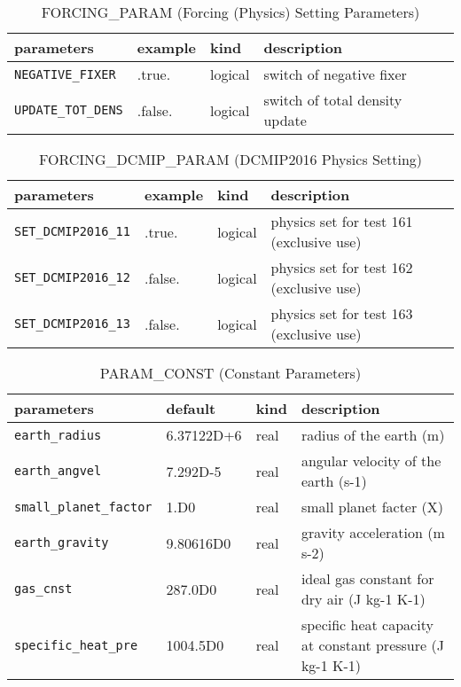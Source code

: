 \begin{table}[htb]
\begin{center}
\caption{FORCING\_PARAM (Forcing (Physics) Setting Parameters)}
\begin{tabularx}{150mm}{|l|l|l|X|} \hline
 \rowcolor[gray]{0.9} parameters & example & kind & description          \\ \hline
 \verb|NEGATIVE_FIXER|  & .true.  & logical & switch of negative fixer \\ \hline
 \verb|UPDATE_TOT_DENS| & .false. & logical & switch of total density update \\ \hline
\end{tabularx}
\end{center}
\end{table}

\begin{table}[htb]
\begin{center}
\caption{FORCING\_DCMIP\_PARAM (DCMIP2016 Physics Setting)}
\begin{tabularx}{150mm}{|l|l|l|X|} \hline
 \rowcolor[gray]{0.9} parameters & example & kind & description          \\ \hline
 \verb|SET_DCMIP2016_11| & .true.  & logical & physics set for test 161 (exclusive use) \\ \hline
 \verb|SET_DCMIP2016_12| & .false. & logical & physics set for test 162 (exclusive use) \\ \hline
 \verb|SET_DCMIP2016_13| & .false. & logical & physics set for test 163 (exclusive use) \\ \hline
\end{tabularx}
\end{center}
\end{table}

\begin{table}[htb]
\begin{center}
\caption{PARAM\_CONST (Constant Parameters)}
\begin{tabularx}{150mm}{|l|l|l|X|} \hline
 \rowcolor[gray]{0.9} parameters & default & kind & description          \\ \hline
 \verb|earth_radius| & 6.37122D+6  & real & radius of the earth (m) \\ \hline
 \verb|earth_angvel| & 7.292D-5    & real & angular velocity of the earth (s-1) \\ \hline
 \verb|small_planet_factor| & 1.D0 & real & small planet facter (X) \\ \hline
 \verb|earth_gravity|       & 9.80616D0 & real & gravity acceleration (m s-2) \\ \hline
 \verb|gas_cnst|            & 287.0D0   & real & ideal gas constant for dry air (J kg-1 K-1) \\ \hline
 \verb|specific_heat_pre|   & 1004.5D0  & real & specific heat capacity at constant pressure (J kg-1 K-1) \\ \hline
\end{tabularx}
\end{center}
\end{table}

